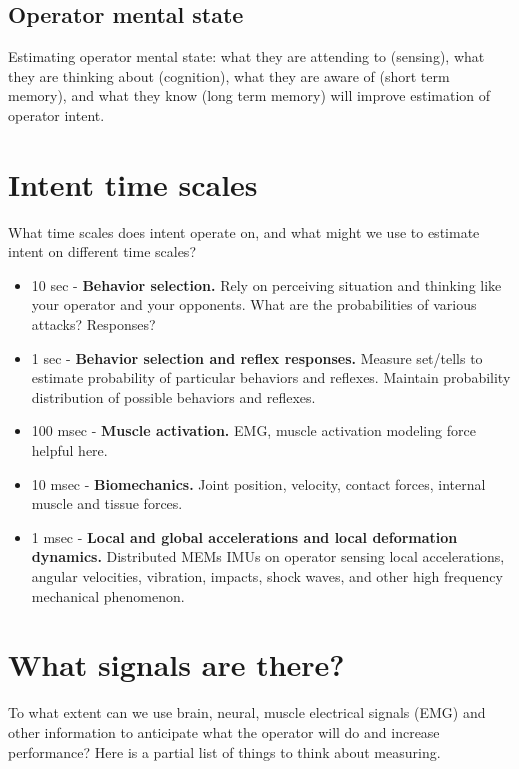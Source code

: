 \documentclass[letterpaper,12pt,fullpage]{article}
\begin{document}
\subsection{Operator mental state}

Estimating operator mental state: what they are attending to (sensing),
what they are thinking about (cognition), what they are aware of (short term
memory), and what
they know (long term memory) will improve estimation of operator intent.

\section{Intent time scales}

What time scales does intent operate on, and what might we use
to estimate intent on different time scales?

\begin{itemize}
\item
10 sec - {\bf Behavior selection.}
Rely on perceiving situation and thinking like your operator and your
opponents.
What are the probabilities of various attacks? Responses?
\item
1 sec - {\bf Behavior selection and reflex responses.}
Measure set/tells to estimate probability of particular behaviors and reflexes.
Maintain probability distribution of possible behaviors and reflexes.
\item
100 msec - {\bf Muscle activation.} EMG, muscle activation modeling
force helpful here.
\item
10 msec - {\bf Biomechanics.} Joint position, velocity, contact forces,
internal muscle and tissue forces.
\item
1 msec - {\bf Local and global accelerations and local deformation dynamics.}
Distributed MEMs IMUs on operator sensing local accelerations,
angular velocities, vibration, impacts, shock waves, and other high
frequency mechanical phenomenon.
\end{itemize}

\section{What signals are there?}

To what extent can we use brain, neural, muscle electrical signals
(EMG) and other information
to anticipate what the operator will do and increase performance?
Here is a partial list of things to think about measuring.
\end{document}

